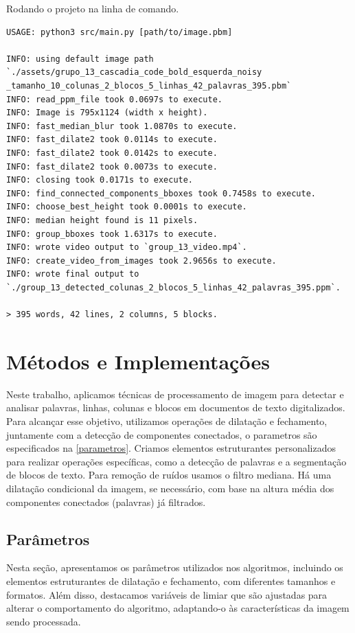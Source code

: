 \documentclass[english, 
               brazil, 
               bsc] %
               {dcomp-abntex2}
\begin{document}
\begin{codigo}[h]
  \caption{\small Rodando o projeto na linha de comando.}
 \label{usage}
\begin{lstlisting}
USAGE: python3 src/main.py [path/to/image.pbm]

INFO: using default image path `./assets/grupo_13_cascadia_code_bold_esquerda_noisy
_tamanho_10_colunas_2_blocos_5_linhas_42_palavras_395.pbm`
INFO: read_ppm_file took 0.0697s to execute.
INFO: Image is 795x1124 (width x height).
INFO: fast_median_blur took 1.0870s to execute.
INFO: fast_dilate2 took 0.0114s to execute.
INFO: fast_dilate2 took 0.0142s to execute.
INFO: fast_dilate2 took 0.0073s to execute.
INFO: closing took 0.0171s to execute.
INFO: find_connected_components_bboxes took 0.7458s to execute.
INFO: choose_best_height took 0.0001s to execute.
INFO: median height found is 11 pixels.
INFO: group_bboxes took 1.6317s to execute.
INFO: wrote video output to `group_13_video.mp4`.
INFO: create_video_from_images took 2.9656s to execute.
INFO: wrote final output to `./group_13_detected_colunas_2_blocos_5_linhas_42_palavras_395.ppm`.

> 395 words, 42 lines, 2 columns, 5 blocks.
\end{lstlisting}
\end{codigo}


\chapter{Métodos e Implementações}\label{ch-detalhes}

Neste trabalho, aplicamos técnicas de processamento de imagem para detectar e analisar palavras, linhas, colunas e blocos em documentos de texto digitalizados. Para alcançar esse objetivo, utilizamos operações de dilatação e fechamento, juntamente com a detecção de componentes conectados, o parametros são especificados na \autoref{parametros}. Criamos elementos estruturantes personalizados para realizar operações específicas, como a detecção de palavras e a segmentação de blocos de texto. Para remoção de ruídos usamos o filtro mediana. Há uma dilatação condicional da imagem, se necessário, com base na altura média dos componentes conectados (palavras) já filtrados.

\section{Parâmetros} \label{parametros}
Nesta seção, apresentamos os parâmetros utilizados nos algoritmos, incluindo os elementos estruturantes de dilatação e fechamento, com diferentes tamanhos e formatos. Além disso, destacamos variáveis de limiar que são ajustadas para alterar o comportamento do algoritmo, adaptando-o às características da imagem sendo processada.
\end{document}
